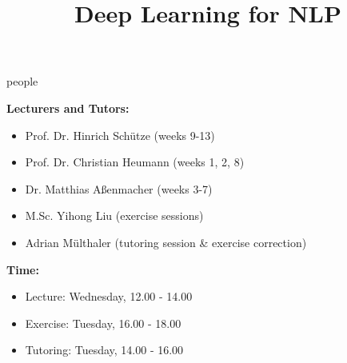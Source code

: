\documentclass[11pt,compress,t,notes=noshow, xcolor=table]{beamer}
\title{Deep Learning for NLP}
\begin{document}


\begin{frame}{people}

\vfill

\textbf{Lecturers and Tutors:}

	\begin{itemize}
		\item Prof. Dr. Hinrich Schütze (weeks 9-13)
		\item Prof. Dr. Christian Heumann (weeks 1, 2, 8)
		\item Dr. Matthias Aßenmacher (weeks 3-7)
		\item M.Sc. Yihong Liu (exercise sessions)
		\item Adrian Mülthaler (tutoring session \& exercise correction)
	\end{itemize}

\textbf{Time:}

	\begin{itemize}
		\item Lecture: Wednesday, 12.00 - 14.00
		\item Exercise: Tuesday, 16.00 - 18.00
		\item Tutoring: Tuesday, 14.00 - 16.00
	\end{itemize}

\vfill

\end{frame}


\end{document}
